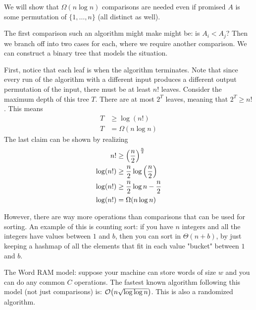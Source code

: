\begin{theorem} 
    We will show that $\Omega(n \log n)$ comparisons are needed even if promised
    $A$ is some permutation of $\{1, \dots, n\}$ (all distinct as well).

    \begin{proof*}
        The first comparison such an algorithm might make might be:
        is $A_i < A_j$? Then we branch off into two cases for each, where we require another comparison.
        We can construct a binary tree that models the situation.



        First, notice that each leaf is when the algorithm terminates. Note that since every run of the algorithm with a different
        input produces a different output permutation of the input, there must be at least $n!$ leaves.
        Consider the maximum depth of this tree $T$. There are at most $2^T$ leaves, meaning that $2^T \geq n!$. This means
        \begin{align*}
            T &\geq \log(n!) \\
            T &= \Omega(n \log n)
        \end{align*}
        The last claim can be shown by realizing
        \begin{align*}
            n! &\geq \qty(\frac{n}{2})^\frac{n}{2} \\
            \log(n!) &\geq \frac{n}{2} \log\qty(\frac{n}{2})\\
            \log(n!) &\geq \frac{n}{2} \log n - \frac{n}{2} \\
            \log(n!) &= \Omega(n \log n)
        \end{align*}
    \end{proof*}
\end{theorem}

However, there are way more operations than comparisons that can be used for sorting. An example of this is counting sort:
if you have $n$ integers and all the integers have values between $1$ and $b$, then you can sort in $\Theta(n + b)$, by just
keeping a hashmap of all the elements that fit in each value "bucket" between $1$ and $b$. 

The Word RAM model: suppose your machine can store words of size $w$ and you can do any common $C$ operations. The fastest known algorithm
following this model (not just comparisons) is: $\mathcal{O}\qty(n \sqrt{\log \log n})$. This is also a randomized algorithm.


